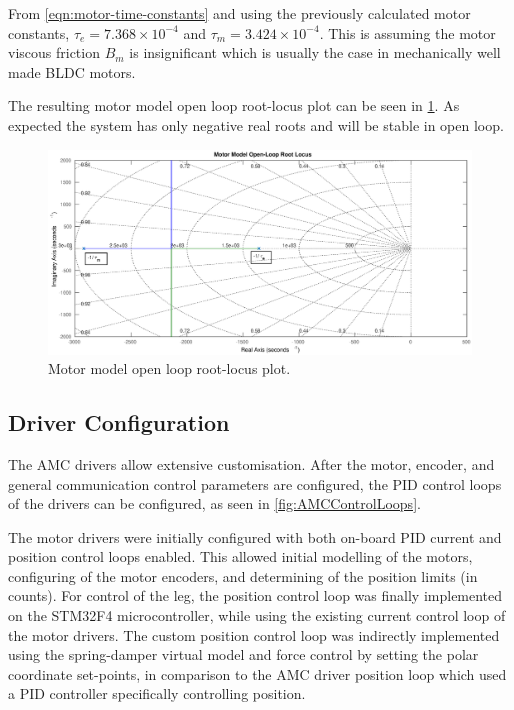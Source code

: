 From \cref{eqn:motor-time-constants} and using the previously calculated motor constants, $\tau_e = 7.368 \times 10^{-4}$ and $\tau_m = 3.424 \times 10^{-4}$. This is assuming the motor viscous friction $B_m$ is insignificant which is usually the case in mechanically well made BLDC motors.

The resulting motor model open loop root-locus plot can be seen in \cref{fig:ol-motor-rlocus}. As expected the system has only negative real roots and will be stable in open loop.

\begin{figure}
\centering
\includegraphics[width=1\textwidth]{images/motor/ol-motor-rlocus} 
\caption{Motor model open loop root-locus plot.}
\label{fig:ol-motor-rlocus}
\end{figure}


\subsection{Driver Configuration}
\label{sec:Driver Configuration}

The AMC drivers allow extensive customisation. After the motor, encoder, and general communication control parameters are configured, the PID control loops of the drivers can be configured, as seen in \cref{fig:AMCControlLoops}.

The motor drivers were initially configured with both on-board PID current and position control loops enabled. This allowed initial modelling of the motors, configuring of the motor encoders, and determining of the position limits (in counts). For control of the leg, the position control loop was finally implemented on the STM32F4 microcontroller, while using the existing current control loop of the motor drivers. The custom position control loop was indirectly implemented using the spring-damper virtual model and force control by setting the polar coordinate set-points, in comparison to the AMC driver position loop which used a PID controller specifically controlling position.

